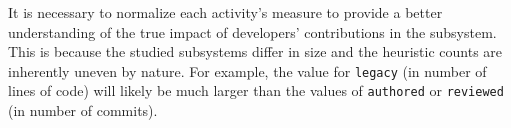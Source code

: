 
It is necessary to normalize each activity's measure %
to provide a better understanding of the true impact of developers' contributions in the subsystem. This is because the studied subsystems differ in size and the heuristic counts are inherently uneven by nature. For example, the value for \texttt{legacy} (in number of lines of code) will likely be much larger than the values of \texttt{authored} or \texttt{reviewed} (in number of commits). %










